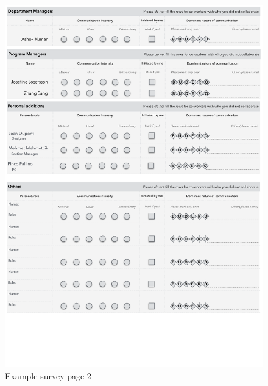 \begin{figure}[h!]
  \includegraphics[width=1.0\textwidth]{figures/fake-survey-2.pdf}
  \centering
  \caption{Example survey page 2}
  \label{fig:fake-survey-2}
\end{figure}
